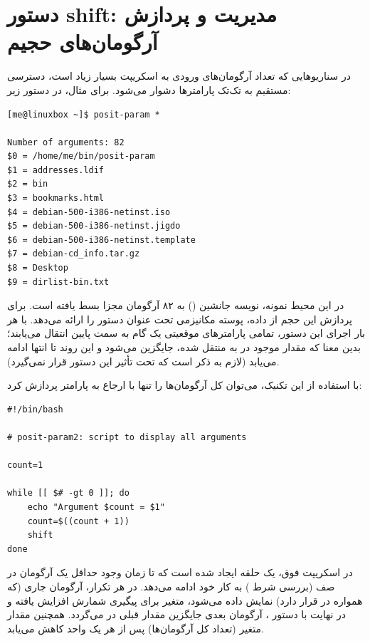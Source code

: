 \section{دستور shift: مدیریت و پردازش آرگومان‌های حجیم}

در سناریوهایی که تعداد آرگومان‌های ورودی به اسکریپت بسیار زیاد است، دسترسی مستقیم به تک‌تک پارامترها دشوار می‌شود. برای مثال، در دستور زیر:

\begin{latin}
\begin{lstlisting}
[me@linuxbox ~]$ posit-param *

Number of arguments: 82
$0 = /home/me/bin/posit-param
$1 = addresses.ldif
$2 = bin
$3 = bookmarks.html
$4 = debian-500-i386-netinst.iso
$5 = debian-500-i386-netinst.jigdo
$6 = debian-500-i386-netinst.template
$7 = debian-cd_info.tar.gz
$8 = Desktop
$9 = dirlist-bin.txt
\end{lstlisting}
\end{latin}

در این محیط نمونه، نویسه جانشین () \cmd{*} به ۸۲ آرگومان مجزا بسط یافته است. برای پردازش این حجم از داده، پوسته  مکانیزمی تحت عنوان دستور  را ارائه می‌دهد. با هر بار اجرای این دستور، تمامی پارامترهای موقعیتی یک گام به سمت پایین انتقال می‌یابند؛ بدین معنا که مقدار موجود در  به  منتقل شده،  جایگزین  می‌شود و این روند تا انتها ادامه می‌یابد (لازم به ذکر است که  تحت تأثیر این دستور قرار نمی‌گیرد).

با استفاده از این تکنیک، می‌توان کل آرگومان‌ها را تنها با ارجاع به پارامتر  پردازش کرد:

\begin{latin}
\begin{lstlisting}
#!/bin/bash

# posit-param2: script to display all arguments

count=1

while [[ $# -gt 0 ]]; do
    echo "Argument $count = $1"
    count=$((count + 1))
    shift
done
\end{lstlisting}
\end{latin}

در اسکریپت  فوق، یک حلقه  ایجاد شده است که تا زمان وجود حداقل یک آرگومان در صف (بررسی شرط ) به کار خود ادامه می‌دهد. در هر تکرار، آرگومان جاری (که همواره در  قرار دارد) نمایش داده می‌شود، متغیر  برای پیگیری شمارش افزایش یافته و در نهایت با دستور ، آرگومان بعدی جایگزین مقدار قبلی در  می‌گردد. همچنین مقدار متغیر \cmd{\$\#} (تعداد کل آرگومان‌ها) پس از هر  یک واحد کاهش می‌یابد.

